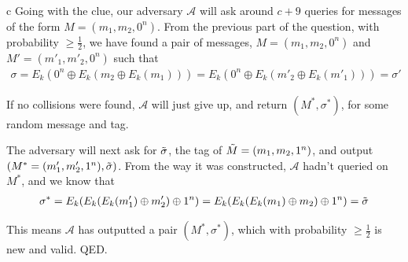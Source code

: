 \documentclass{article}
\begin{document}
\begin{paragraph}
    c Going with the clue, our adversary $\mathcal{A}$ will ask around $c + 9$ queries for messages of the form $M = (m_1, m_2, 0^n)$. From the previous part of the question, with probability $\geq \frac{1}{2}$, we have found a pair of messages, $M = (m_1, m_2, 0^n)$ and $M' = (m'_1, m'_2, 0^n)$ such that
    \begin{align*}
        \sigma = E_k(0^n \oplus E_k(m_2 \oplus E_k(m_1))) = E_k(0^n \oplus E_k(m'_2 \oplus E_k(m'_1))) = \sigma'
    \end{align*}
    
    If no collisions were found, $\mathcal{A}$ will just give up, and return $(M^*, \sigma^*)$, for some random message and tag.
    
    The adversary will next ask for $\Tilde{\sigma}$, the tag of $\Tilde{M} = (m_1, m_2, 1^n)$, and output $\left(M^* = (m'_1, m'_2, 1^n), \Tilde{\sigma}\right)$. From the way it was constructed, $\mathcal{A}$ hadn't queried on $M^*$, and we know that
    \begin{align*}
        \sigma^* = E_k(E_k(E_k(m'_1) \oplus m'_2) \oplus 1^n) = E_k(E_k(E_k(m_1) \oplus m_2) \oplus 1^n) = \Tilde{\sigma}
    \end{align*}
    
    This means $\mathcal{A}$ has outputted a pair $(M^*, \sigma^*)$, which with probability $\geq \frac{1}{2}$ is new and valid. QED.
\end{paragraph}
\end{document}
